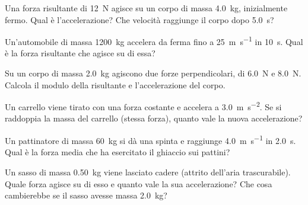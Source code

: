 \begin{esercizio}
Una forza risultante di \SI{12}{\newton} agisce su un corpo di massa \SI{4,0}{\kilo\gram}, inizialmente fermo. Qual è l'accelerazione? Che velocità raggiunge il corpo dopo \SI{5,0}{\second}?\\
\end{esercizio}

\begin{esercizio}
Un'automobile di massa \SI{1200}{\kilo\gram} accelera da ferma fino a \SI{25}{\metre\per\second} in \SI{10}{\second}. Qual è la forza risultante che agisce su di essa?\\
\end{esercizio}

\begin{esercizio}
Su un corpo di massa \SI{2,0}{\kilo\gram} agiscono due forze perpendicolari, di \SI{6,0}{\newton} e \SI{8,0}{\newton}. Calcola il modulo della risultante e l'accelerazione del corpo.\\
\end{esercizio}

\begin{esercizio}
Un carrello viene tirato con una forza costante e accelera a \SI{3,0}{\metre\per\second\squared}. Se si raddoppia la massa del carrello (stessa forza), quanto vale la nuova accelerazione?\\
\end{esercizio}

\begin{esercizio}
Un pattinatore di massa \SI{60}{\kilo\gram} si dà una spinta e raggiunge \SI{4,0}{\metre\per\second} in \SI{2,0}{\second}. Qual è la forza media che ha esercitato il ghiaccio sui pattini?\\
\end{esercizio}

\begin{esercizio}
Un sasso di massa \SI{0,50}{\kilo\gram} viene lasciato cadere (attrito dell'aria trascurabile). Quale forza agisce su di esso e quanto vale la sua accelerazione? Che cosa cambierebbe se il sasso avesse massa \SI{2,0}{\kilo\gram}?\\
\end{esercizio}

